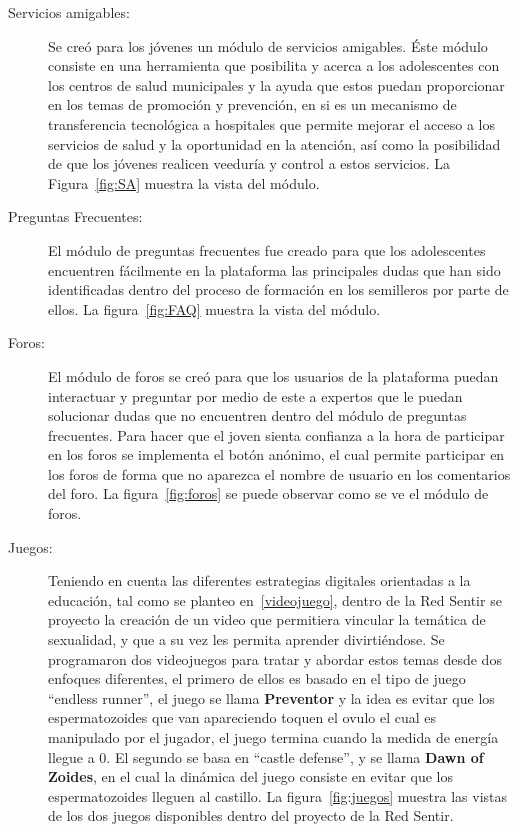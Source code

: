 \documentclass[a4paper]{article}
\begin{document}
\begin{description}
\item[Servicios amigables:] Se creó para los jóvenes un módulo de servicios amigables. Éste módulo 
consiste en una herramienta que posibilita y acerca a los adolescentes con los centros de salud municipales y la ayuda que estos puedan proporcionar en los temas de promoción y prevención, en si es un mecanismo de transferencia tecnológica a hospitales que permite mejorar el acceso a los servicios de salud y la oportunidad en la atención, así como la posibilidad de que los jóvenes realicen veeduría y control a estos servicios. La Figura~\ref{fig:SA} muestra la vista del módulo. 

\item[Preguntas Frecuentes:] El módulo de preguntas frecuentes fue creado para que los adolescentes encuentren fácilmente en la plataforma las principales dudas que han sido identificadas dentro del proceso de formación en los semilleros por parte de ellos. La figura~\ref{fig:FAQ} muestra la vista del módulo.

\item[Foros:] El módulo de foros se creó para que los usuarios de la plataforma puedan interactuar y preguntar por medio de este a expertos que le puedan solucionar dudas que no encuentren dentro del módulo de preguntas frecuentes. Para hacer que el joven sienta confianza a la hora de participar en los foros se implementa el botón anónimo, el cual permite participar en los foros de forma que no aparezca el nombre de usuario en los comentarios del foro. La figura~\ref{fig:foros} se puede observar como se ve el módulo de foros.

\item[Juegos:] Teniendo en cuenta las diferentes estrategias digitales orientadas a la educación, tal como se planteo en~\ref{videojuego}, dentro de la Red Sentir se proyecto la creación de un video que permitiera vincular la temática de sexualidad, y que a su vez les permita aprender divirtiéndose. Se programaron dos videojuegos para tratar y abordar estos temas desde dos enfoques diferentes, el primero de ellos es basado en el tipo de juego ``endless runner'', el juego se llama \textbf{Preventor} y la idea es evitar que los espermatozoides que van apareciendo toquen el ovulo el cual es manipulado por el jugador, el juego termina cuando la medida de energía llegue a $0$. El segundo se basa en ``castle defense'', y se llama \textbf{Dawn of Zoides}, en el cual la dinámica del juego consiste en evitar que los espermatozoides lleguen al castillo.  La figura~\ref{fig:juegos} muestra las vistas de los dos juegos disponibles dentro del proyecto de la Red Sentir.


\end{description}
\end{document}
